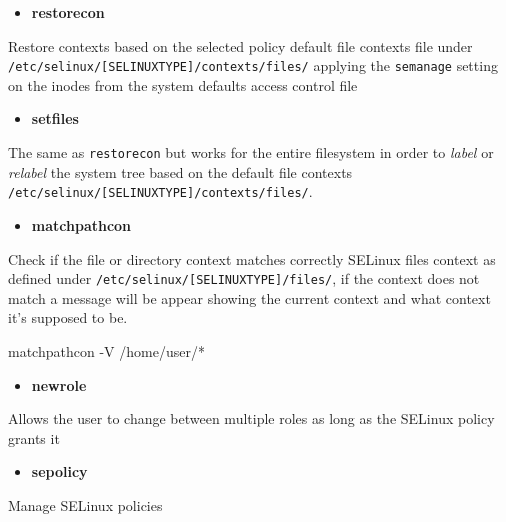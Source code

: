 \documentclass[
  14pt,
  english,
  a4paper,
]{scrreprt}
\newenvironment{Shaded}{}{}
\newcommand{\ExtensionTok}[1]{#1}
\newcommand{\NormalTok}[1]{#1}
\providecommand{\tightlist}{%
  \setlength{\itemsep}{0pt}\setlength{\parskip}{0pt}}
\begin{document}
\begin{itemize}
\tightlist
\item
  \textbf{restorecon}
\end{itemize}

Restore contexts based on the selected policy default file contexts file
under \texttt{/etc/selinux/{[}SELINUXTYPE{]}/contexts/files/} applying
the \texttt{semanage} setting on the inodes from the system defaults
access control file

\begin{itemize}
\tightlist
\item
  \textbf{setfiles}
\end{itemize}

The same as \texttt{restorecon} but works for the entire filesystem in
order to \emph{label} or \emph{relabel} the system tree based on the
default file contexts
\texttt{/etc/selinux/{[}SELINUXTYPE{]}/contexts/files/}.

\begin{itemize}
\tightlist
\item
  \textbf{matchpathcon}
\end{itemize}

Check if the file or directory context matches correctly SELinux files
context as defined under \texttt{/etc/selinux/{[}SELINUXTYPE{]}/files/},
if the context does not match a message will be appear showing the
current context and what context it's supposed to be.

\begin{Shaded}
\begin{Highlighting}[]
\ExtensionTok{matchpathcon}\NormalTok{ {-}V /home/user/*}
\end{Highlighting}
\end{Shaded}

\begin{itemize}
\tightlist
\item
  \textbf{newrole}
\end{itemize}

Allows the user to change between multiple roles as long as the SELinux
policy grants it

\begin{itemize}
\tightlist
\item
  \textbf{sepolicy}
\end{itemize}

Manage SELinux policies
\end{document}

